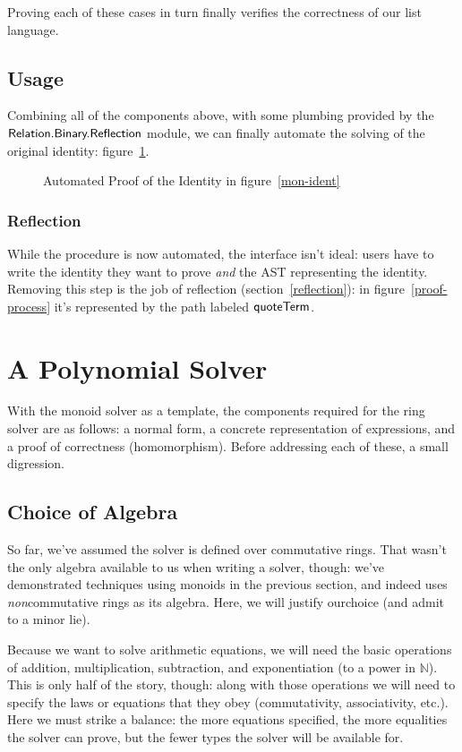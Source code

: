 \documentclass[draft, twocolumn]{article}
\theoremstyle{definition}
\theoremstyle{definition}
\begin{document}
Proving each of these cases in turn finally verifies the correctness of our list
language.
\subsection{Usage}
Combining all of the components above, with some plumbing provided by the
\(\AgdaModule{Relation.Binary.Reflection}\) module, we can finally automate the
solving of the original identity: figure~\ref{mon-auto-proof}.
\begin{figure}
  \caption{Automated Proof of the Identity in figure~\ref{mon-ident}}
  \label{mon-auto-proof}
\end{figure}
\subsubsection{Reflection}
While the procedure is now automated, the interface isn't ideal: users have to
write the identity they want to prove \emph{and} the AST representing the
identity. Removing this step is the job of reflection
(section~\ref{reflection}): in figure~\ref{proof-process} it's represented by
the path labeled \(\AgdaKeyword{quoteTerm}\).
\section{A Polynomial Solver} \label{a-poly-solver}
With the monoid solver as a template, the components required for the ring
solver are as follows: a normal form, a concrete representation of
expressions, and a proof of correctness (homomorphism). Before addressing each
of these, a small digression.
\subsection{Choice of Algebra}
So far, we've assumed the solver is defined over commutative rings. That wasn't
the only algebra available to us when writing a solver, though: we've
demonstrated techniques using monoids in the previous section, and
indeed\cite{geuvers_automatically_2017} uses \emph{non}commutative rings as its
algebra. Here, we will justify our\footnotemark choice (and admit to a minor lie).

Because we want to solve arithmetic equations, we will need the basic operations
of addition, multiplication, subtraction, and exponentiation (to a power in
\(\mathbb{N}\)). This is only half of the story, though: along with those
operations we will need to specify the laws or equations that they obey
(commutativity, associativity, etc.). Here we must strike a balance: the more
equations specified, the more equalities the solver can prove, but the fewer
types the solver will be available for.
\end{document}
